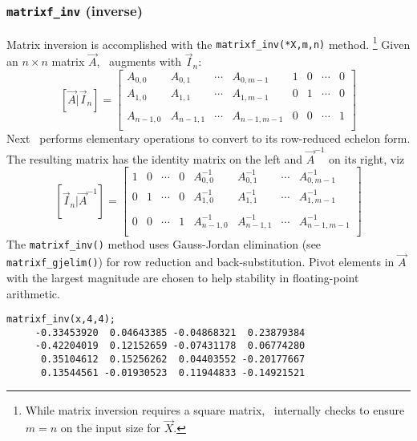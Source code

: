 \subsubsection{{\tt matrixf\_inv} (inverse)}
\label{module:matrix:inv}
Matrix inversion is accomplished with the {\tt matrixf\_inv(*X,m,n)}
method.%
\footnote{While matrix inversion requires a square matrix, \liquid\
          internally checks to ensure $m=n$ on the input size for
          $\vec{X}$.}
Given an $n \times n$ matrix $\vec{A}$, \liquid\ augments with
$\vec{I}_n$:
\[
    \left[\vec{A}|\vec{I}_n\right] = 
    \left[
    \begin{array}{cccc|cccc}
    A_{0,0}     & A_{0,1}   & \cdots  & A_{0,m-1}   & 1 & 0 & \cdots & 0 \\
    A_{1,0}     & A_{1,1}   & \cdots  & A_{1,m-1}   & 0 & 1 & \cdots & 0 \\
                &           &         &             &   &   &        &   \\
    A_{n-1,0}   & A_{n-1,1} & \cdots  & A_{n-1,m-1} & 0 & 0 & \cdots & 1 \\
    \end{array}
    \right]
\]
Next \liquid\ performs elementary operations to convert to its
row-reduced echelon form.
The resulting matrix has the identity matrix on the left and
$\vec{A}^{-1}$ on its right, viz
\[
    \left[\vec{I}_n|\vec{A}^{-1}\right] = 
    \left[
    \begin{array}{cccc|cccc}
1 & 0 & \cdots & 0 & A^{-1}_{0,0}   & A^{-1}_{0,1}   & \cdots  & A^{-1}_{0,m-1}   \\
0 & 1 & \cdots & 0 & A^{-1}_{1,0}   & A^{-1}_{1,1}   & \cdots  & A^{-1}_{1,m-1}   \\
  &   &        &   &                &                &         &                  \\
0 & 0 & \cdots & 1 & A^{-1}_{n-1,0} & A^{-1}_{n-1,1} & \cdots  & A^{-1}_{n-1,m-1} \\
    \end{array}
    \right]
\]
The {\tt matrixf\_inv()} method uses Gauss-Jordan elimination
(see {\tt matrixf\_gjelim()}) for row reduction and back-substitution.
Pivot elements in $\vec{A}$ with the largest magnitude are chosen to
help stability in floating-point arithmetic.
%
\begin{Verbatim}[fontsize=\small]
    matrixf_inv(x,4,4);
     -0.33453920  0.04643385 -0.04868321  0.23879384
     -0.42204019  0.12152659 -0.07431178  0.06774280
      0.35104612  0.15256262  0.04403552 -0.20177667
      0.13544561 -0.01930523  0.11944833 -0.14921521
\end{Verbatim}


